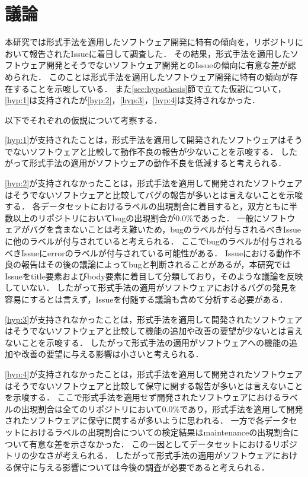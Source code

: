 \documentclass[main]{subfiles}
\begin{document}
\chapter{議論}

本研究では形式手法を適用したソフトウェア開発に特有の傾向を，リポジトリにおいて報告されたIssueに着目して調査した．
その結果，形式手法を適用したソフトウェア開発とそうでないソフトウェア開発とのIssueの傾向に有意な差が認められた．
このことは形式手法を適用したソフトウェア開発に特有の傾向が存在することを示唆している．
また\ref{sec:hypothesis}節で立てた仮説について，\ref{hyp:1}は支持されたが\ref{hyp:2}，\ref{hyp:3}，\ref{hyp:4}は支持されなかった．

以下でそれぞれの仮説について考察する．

\ref{hyp:1}が支持されたことは，形式手法を適用して開発されたソフトウェアはそうでないソフトウェアと比較して動作不良の報告が少ないことを示唆する．
したがって形式手法の適用がソフトウェアの動作不良を低減すると考えられる．

\ref{hyp:2}が支持されなかったことは，形式手法を適用して開発されたソフトウェアはそうでないソフトウェアと比較してバグの報告が多いとは言えないことを示唆する．
各データセットにおけるラベルの出現割合に着目すると，双方ともに半数以上のリポジトリにおいてbugの出現割合が0.0\%であった．
一般にソフトウェアがバグを含まないことは考え難いため，bugのラベルが付与されるべきIssueに他のラベルが付与されていると考えられる．
ここでbugのラベルが付与されるべきIssueにerrorのラベルが付与されている可能性がある．
Issueにおける動作不良の報告はその後の議論によってbugと判断されることがあるが，本研究ではIssueをtitle要素およびbody要素に着目して分類しており，そのような議論を反映していない．
したがって形式手法の適用がソフトウェアにおけるバグの発見を容易にするとは言えず，Issueを付随する議論も含めて分析する必要がある．

\ref{hyp:3}が支持されなかったことは，形式手法を適用して開発されたソフトウェアはそうでないソフトウェアと比較して機能の追加や改善の要望が少ないとは言えないことを示唆する．
したがって形式手法の適用がソフトウェアへの機能の追加や改善の要望に与える影響は小さいと考えられる．

\ref{hyp:4}が支持されなかったことは，形式手法を適用して開発されたソフトウェアはそうでないソフトウェアと比較して保守に関する報告が多いとは言えないことを示唆する．
ここで形式手法を適用せず開発されたソフトウェアにおけるラベルの出現割合は全てのリポジトリにおいて0.0\%であり，形式手法を適用して開発されたソフトウェアに保守に関するが多いように思われる．
一方で各データセットにおけるラベルの出現割合についての検定結果はmaintenanceの出現割合について有意な差を示さなかった．
この一因としてデータセットにおけるリポジトリの少なさが考えられる．
したがって形式手法の適用がソフトウェアにおける保守に与える影響については今後の調査が必要であると考えられる．
\end{document}
